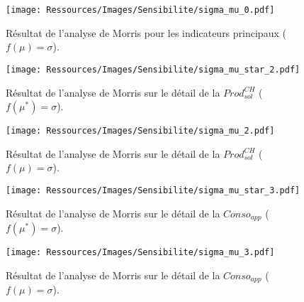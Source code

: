 
\begin{figure}
    \centering
    \texttt{[image: Ressources/Images/Sensibilite/sigma\_mu\_0.pdf]}
    \caption[Résultat de l’analyse de Morris pour les indicateurs principaux
             ($f(\mu) = \sigma$)]
            {Résultat de l’analyse de Morris pour les indicateurs principaux
             ($f(\mu) = \sigma$).}
    \label{fig:objectifs_mu}
\end{figure}

\begin{figure}
    \centering
    \texttt{[image: Ressources/Images/Sensibilite/sigma\_mu\_star\_2.pdf]}
    \caption[Résultat de l’analyse de Morris sur le détail de la
             $Prod_{sol}^{CH}$ ($f(\mu^{*}) = \sigma$)]
            {Résultat de l’analyse de Morris sur le détail de la
             $Prod_{sol}^{CH}$ ($f(\mu^{*}) = \sigma$).}
    \label{fig:prod_sol_chauffage_mu_star}
\end{figure}

\begin{figure}
    \centering
    \texttt{[image: Ressources/Images/Sensibilite/sigma\_mu\_2.pdf]}
    \caption[Résultat de l’analyse de Morris sur le détail de la
             $Prod_{sol}^{CH}$ ($f(\mu) = \sigma$)]
            {Résultat de l’analyse de Morris sur le détail de la
             $Prod_{sol}^{CH}$ ($f(\mu) = \sigma$).}
    \label{fig:prod_sol_chauffage_mu}
\end{figure}


\begin{figure}
    \centering
    \texttt{[image: Ressources/Images/Sensibilite/sigma\_mu\_star\_3.pdf]}
    \caption[Résultat de l’analyse de Morris sur le détail de la
             $Conso_{app}$ ($f(\mu^{*}) = \sigma$)]
            {Résultat de l’analyse de Morris sur le détail de la
             $Conso_{app}$ ($f(\mu^{*}) = \sigma$).}
    \label{fig:conso_app_mu_star}
\end{figure}

\begin{figure}
    \centering
    \texttt{[image: Ressources/Images/Sensibilite/sigma\_mu\_3.pdf]}
    \caption[Résultat de l’analyse de Morris sur le détail de la
             $Conso_{app}$ ($f(\mu) = \sigma$)]
            {Résultat de l’analyse de Morris sur le détail de la
             $Conso_{app}$ ($f(\mu) = \sigma$).}
    \label{fig:conso_app_mu}
\end{figure}


